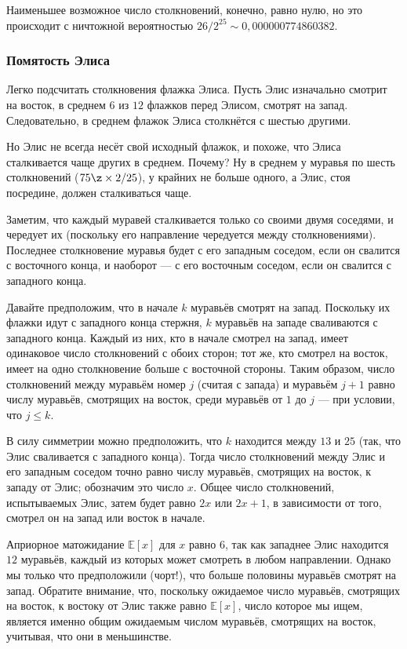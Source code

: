 Наименьшее возможное число столкновений, конечно, равно нулю, но это происходит с ничтожной вероятностью $26/2^{25} \sim 0{,}000000774860382$.


\subsubsection*{Помятость Элиса}

Легко подсчитать столкновения флажка Элиса.
Пусть Элис изначально смотрит на восток, в среднем $6$ из $12$ флажков перед Элисом, смотрят на запад.
Следовательно, в среднем  флажок Элиса столкнётся с шестью другими.

Но Элис не всегда несёт свой исходный флажок, и похоже, что Элиса сталкивается чаще других в среднем.
Почему?
Ну в среднем у муравья по шесть столкновений ($75 \z\times 2/25$), у крайних не больше одного, а Элис, стоя посредине, должен сталкиваться чаще.

Заметим, что каждый муравей сталкивается только со своими двумя соседями,
и чередует их (поскольку его направление чередуется между столкновениями).
Последнее столкновение муравья будет с его западным соседом, если он свалится с восточного конца, и наоборот --- с его восточным соседом, если он свалится с западного конца.

Давайте предположим, что в начале $k$ муравьёв смотрят на запад.
Поскольку их флажки идут с западного конца стержня, $k$ муравьёв на западе сваливаются с западного конца.
Каждый из них, кто в начале смотрел на запад, имеет одинаковое число столкновений с обоих сторон;
тот же, кто смотрел на восток, имеет на одно столкновение больше с восточной стороны.
Таким образом, число столкновений между муравьём  номер $j$ (считая с запада) и муравьём 
$j+1$ равно числу муравьёв, смотрящих на восток, среди муравьёв от $1$ до $j$ --- при условии, что $j\le k$.

В силу симметрии можно предположить, что $k$ находится между $13$ и $25$ (так, что Элис сваливается с западного конца).
Тогда число столкновений между Элис и его западным соседом точно равно числу муравьёв, смотрящих на восток, к западу от Элис; обозначим это число $x$.
Общее число столкновений, испытываемых Элис, затем будет равно $2x$ или $2x+1$, в зависимости от того, смотрел он на запад или восток в начале.

Априорное матожидание $\mathbb{E}[x]$ для $x$ равно $6$, так как западнее Элис находится $12$ муравьёв, каждый из которых может смотреть в любом направлении.
Однако мы только что предположили (чорт!), что больше половины муравьёв смотрят на запад.
Обратите внимание, что, поскольку ожидаемое число муравьёв, смотрящих на восток, к востоку от Элис также равно $\mathbb{E}[x]$, число которое мы ищем, является именно общим ожидаемым числом муравьёв, смотрящих на восток, учитывая, что они в меньшинстве.

